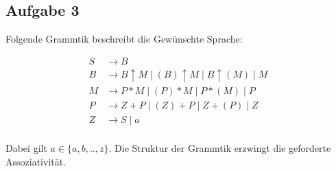 \subsection*{Aufgabe 3}

Folgende Grammtik beschreibt die Gewünschte Sprache:

\begin{align*}
	S &\to B  \\
	B &\to B \uparrow M  \mid (B) \uparrow M \mid B \uparrow (M) \mid M \\
	M &\to P * M \mid (P) * M \mid P * (M) \mid P \\
	P &\to Z + P \mid  (Z) + P \mid Z + (P) \mid Z \\
	Z &\to S \mid a \\
\end{align*}

Dabei gilt $a \in \{a,b, ..,z \}$. Die Struktur der Grammtik erzwingt die geforderte Assoziativität.